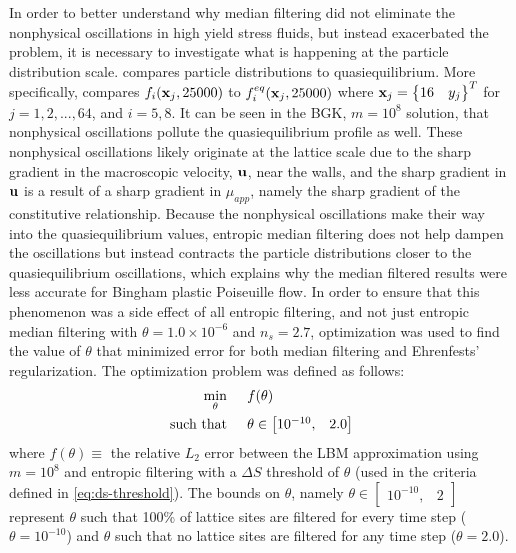In order to better understand why median filtering did not eliminate the nonphysical oscillations in high yield stress fluids, but instead exacerbated the problem, it is necessary to investigate what is happening at the particle distribution scale.
 compares particle distributions to quasiequilibrium.
More specifically,  compares $f_i(\mathbf{x}_j, 25000)$ to $f_i^{eq}(\mathbf{x}_j, 25000)$ where $\mathbf{x}_j = \begin{Bmatrix}16 & y_j\end{Bmatrix}^T$ for $j = 1, 2, ..., 64$, and $i = 5, 8$.
It can be seen in the BGK, $m = 10^8$ solution, that nonphysical oscillations pollute the quasiequilibrium profile as well.
These nonphysical oscillations likely originate at the lattice scale due to the sharp gradient in the macroscopic velocity, $\mathbf{u}$, near the walls, and the sharp gradient in $\mathbf{u}$ is a result of a sharp gradient in $\mu_{app}$, namely the sharp gradient of the constitutive relationship.
Because the nonphysical oscillations make their way into the quasiequilibrium values, entropic median filtering does not help dampen the oscillations but instead contracts the particle distributions closer to the quasiequilibrium oscillations, which explains why the median filtered results were less accurate for Bingham plastic Poiseuille flow.
In order to ensure that this phenomenon was a side effect of all entropic filtering, and not just entropic median filtering with $\theta = 1.0 \times 10^{-6}$ and $n_s = 2.7$, optimization was used to find the value of $\theta$ that minimized error for both median filtering and Ehrenfests' regularization.
The optimization problem was defined as follows:
\begin{align*}
  \min_\theta \hspace{0.2in} & f(\theta)\\
  \text{such that} \hspace{0.2in} & \theta \in \begin{bmatrix}10^{-10}, & 2.0\end{bmatrix}
\end{align*}
\noindent where $f(\theta) \equiv $ the relative $L_2$ error between the LBM approximation using $m = 10^8$ and entropic filtering with a $\Delta S$ threshold of $\theta$ (used in the criteria defined in \eqref{eq:ds-threshold}).
The bounds on $\theta$, namely $\theta \in \begin{bmatrix}10^{-10}, & 2\end{bmatrix}$ represent $\theta$ such that 100\% of lattice sites are filtered for every time step ($\theta = 10^{-10}$) and $\theta$ such that no lattice sites are filtered for any time step ($\theta = 2.0$).
